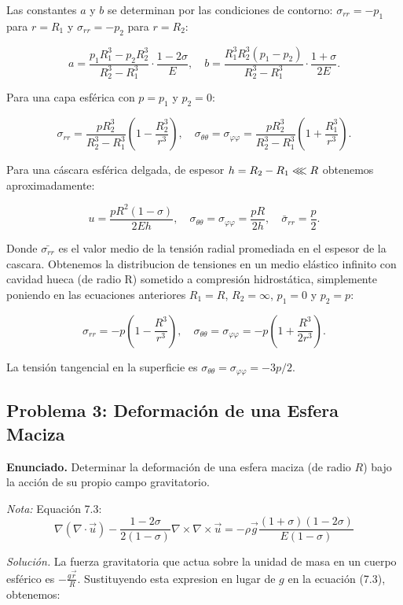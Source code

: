 \documentclass{article}
\begin{document}
Las constantes $a$ y $b$ se determinan por las condiciones de contorno: $\sigma_{rr} = -p_1$ para $r = R_1$ y $\sigma_{rr} = -p_2$ para $r = R_2$:

$$
a = \frac{p_1 R_1^3 - p_2 R_2^3}{R_2^3 - R_1^3} \cdot \frac{1-2\sigma}{E}, \quad b = \frac{R_1^3 R_2^3 (p_1 - p_2)}{R_2^3 - R_1^3} \cdot \frac{1+\sigma}{2E}.
$$

Para una capa esférica con $p = p_1$ y $p_2 = 0$:

$$
\sigma_{rr} = \frac{p R_2^3}{R_2^3 - R_1^3} \left(1 - \frac{R_2^3}{r^3}\right), \quad \sigma_{\theta\theta} = \sigma_{\varphi\varphi} = \frac{p R_2^3}{R_2^3 - R_1^3} \left(1 + \frac{R_1^3}{r^3}\right).
$$

Para una cáscara esférica delgada, de espesor $h= R_2-R_1 \llless R$ obtenemos aproximadamente:

$$
u = \frac{p R^2 (1-\sigma)}{2Eh}, \quad \sigma_{\theta\theta} = \sigma_{\varphi\varphi} = \frac{pR}{2h}, \quad \bar{\sigma}_{rr} = \frac{p}{2}.
$$

Donde $\bar{\sigma_{rr}}$ es el valor medio de la tensión radial promediada en el espesor de la cascara. Obtenemos la distribucion de tensiones en un medio elástico infinito con cavidad hueca (de radio R) sometido a compresión hidrostática, simplemente poniendo en las ecuaciones anteriores $R_1 = R$, $R_2 = \infty$, $p_1 = 0$ y $p_2 = p$:

$$
\sigma_{rr} = -p \left(1 - \frac{R^3}{r^3}\right), \quad \sigma_{\theta\theta} = \sigma_{\varphi\varphi} = -p \left(1 + \frac{R^3}{2r^3}\right).
$$

La tensión tangencial en la superficie es $\sigma_{\theta\theta} = \sigma_{\varphi\varphi} = -3p/2$.

\subsection*{Problema 3: Deformación de una Esfera Maciza}
\textbf{Enunciado.} Determinar la deformación de una esfera maciza (de radio $R$) bajo la acción de su propio campo gravitatorio.

\textit{Nota:} Equación 7.3: 
$$ \nabla (\nabla \cdot \vec{u}) - \frac{1-2\sigma}{2(1-\sigma)}\nabla \times \nabla \times \vec{u} = -\rho \vec{g}\frac{(1+\sigma)(1-2\sigma)}{E(1-\sigma)}$$

\textit{Solución.} La fuerza gravitatoria que actua sobre la unidad de masa en un cuerpo esférico es $-\frac{g\vec{r}}{R}$. Sustituyendo esta expresion en lugar de $g$ en la ecuación (7.3), obtenemos:
\end{document}

